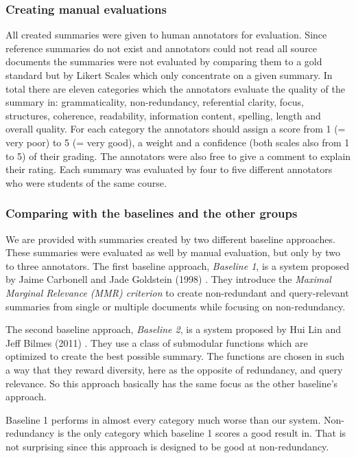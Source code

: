 \subsubsection{Creating manual evaluations}
All created summaries were given to human annotators for evaluation. Since reference summaries do not exist and annotators could not read all source documents the summaries were not evaluated by comparing them to a gold standard but by Likert Scales which only concentrate on a given summary. In total there are eleven categories which the annotators evaluate the quality of the summary in: grammaticality, non-redundancy, referential clarity, focus, structures, coherence, readability, information content, spelling, length and overall quality. For each category the annotators should assign a score from 1 (= very poor) to 5 (= very good), a weight and a confidence (both scales also from 1 to 5) of their grading. The annotators were also free to give a comment to explain their rating. Each summary was evaluated by four to five different annotators who were students of the same course.

\subsubsection{Comparing with the baselines and the other groups}
We are provided with summaries created by two different baseline approaches. These summaries were evaluated as well by manual evaluation, but only by two to three annotators. The first baseline approach, \textit{Baseline 1}, is a system proposed by Jaime Carbonell and Jade Goldstein (1998) \cite{Carbonell:1998:UMD:290941.291025}. They introduce the \textit{Maximal Marginal Relevance (MMR) criterion} to create non-redundant and query-relevant summaries from single or multiple documents while focusing on non-redundancy.

The second baseline approach, \textit{Baseline 2}, is a system proposed by Hui Lin and Jeff Bilmes (2011) \cite{Lin:2011:CSF:2002472.2002537}. They use a class of submodular functions which are optimized to create the best possible summary. The functions are chosen in such a way that they reward diversity, here as the opposite of redundancy, and query relevance. So this approach basically has the same focus as the other baseline's approach.

Baseline 1 performs in almost every category much worse than our system. Non-redundancy is the only category which baseline 1 scores a good result in. That is not surprising since this approach is designed to be good at non-redundancy.

